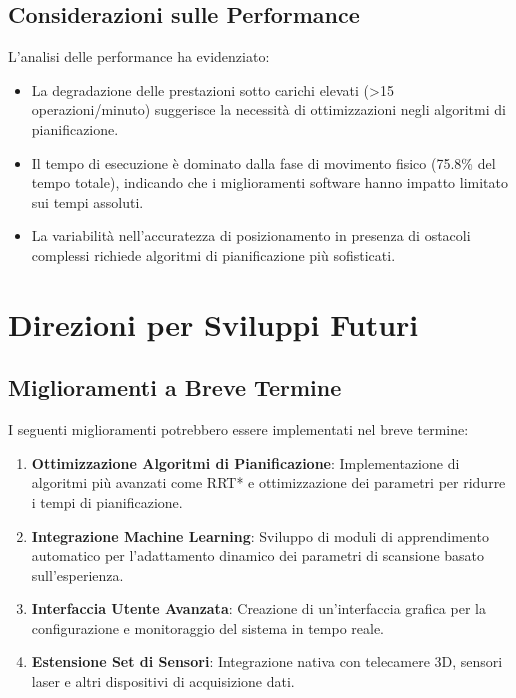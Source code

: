 \documentclass[12pt,a4paper,twoside,openright]{book}
\begin{document}
\subsection{Considerazioni sulle Performance}

L'analisi delle performance ha evidenziato:

\begin{itemize}
    \item La degradazione delle prestazioni sotto carichi elevati (>15 operazioni/minuto) suggerisce la necessità di ottimizzazioni negli algoritmi di pianificazione.
    
    \item Il tempo di esecuzione è dominato dalla fase di movimento fisico (75.8\% del tempo totale), indicando che i miglioramenti software hanno impatto limitato sui tempi assoluti.
    
    \item La variabilità nell'accuratezza di posizionamento in presenza di ostacoli complessi richiede algoritmi di pianificazione più sofisticati.
\end{itemize}

\section{Direzioni per Sviluppi Futuri}

\subsection{Miglioramenti a Breve Termine}

I seguenti miglioramenti potrebbero essere implementati nel breve termine:

\begin{enumerate}
    \item \textbf{Ottimizzazione Algoritmi di Pianificazione}: Implementazione di algoritmi più avanzati come RRT* e ottimizzazione dei parametri per ridurre i tempi di pianificazione.
    
    \item \textbf{Integrazione Machine Learning}: Sviluppo di moduli di apprendimento automatico per l'adattamento dinamico dei parametri di scansione basato sull'esperienza.
    
    \item \textbf{Interfaccia Utente Avanzata}: Creazione di un'interfaccia grafica per la configurazione e monitoraggio del sistema in tempo reale.
    
    \item \textbf{Estensione Set di Sensori}: Integrazione nativa con telecamere 3D, sensori laser e altri dispositivi di acquisizione dati.
\end{enumerate}
\end{document}
